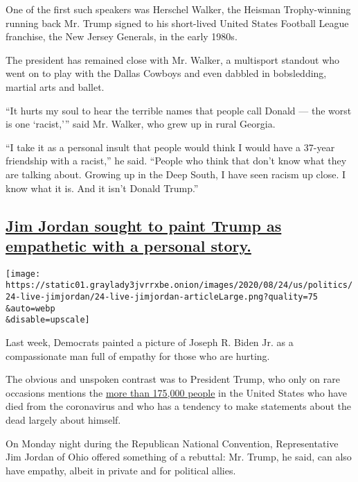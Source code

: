 One of the first such speakers was Herschel Walker, the Heisman
Trophy-winning running back Mr. Trump signed to his short-lived United
States Football League franchise, the New Jersey Generals, in the early
1980s.

The president has remained close with Mr. Walker, a multisport standout
who went on to play with the Dallas Cowboys and even dabbled in
bobsledding, martial arts and ballet.

``It hurts my soul to hear the terrible names that people call Donald
--- the worst is one `racist,''' said Mr. Walker, who grew up in rural
Georgia.

``I take it as a personal insult that people would think I would have a
37-year friendship with a racist,'' he said. ``People who think that
don't know what they are talking about. Growing up in the Deep South, I
have seen racism up close. I know what it is. And it isn't Donald
Trump.''

\hypertarget{jim-jordan-sought-to-paint-trump-as-empathetic-with-a-personal-story}{%
\subsection{\texorpdfstring{\protect\hyperlink{jim-jordan-sought-to-paint-trump-as-empathetic-with-a-personal-story}{Jim
Jordan sought to paint Trump as empathetic with a personal
story.}}{Jim Jordan sought to paint Trump as empathetic with a personal story.}}\label{jim-jordan-sought-to-paint-trump-as-empathetic-with-a-personal-story}}

\texttt{[image: https://static01.graylady3jvrrxbe.onion/images/2020/08/24/us/politics/24-live-jimjordan/24-live-jimjordan-articleLarge.png?quality=75\\\&auto=webp\\\&disable=upscale]}

Last week, Democrats painted a picture of Joseph R. Biden Jr. as a
compassionate man full of empathy for those who are hurting.

The obvious and unspoken contrast was to President Trump, who only on
rare occasions mentions the
\href{https://www.nytimes3xbfgragh.onion/interactive/2020/us/coronavirus-us-cases.html}{more
than 175,000 people} in the United States who have died from the
coronavirus and who has a tendency to make statements about the dead
largely about himself.

On Monday night during the Republican National Convention,
Representative Jim Jordan of Ohio offered something of a rebuttal: Mr.
Trump, he said, can also have empathy, albeit in private and for
political allies.

